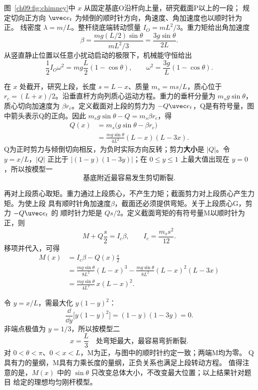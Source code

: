 \begin{xesolution}
图~\ref{ch09:fig:chimney}中 $x$ 从固定基底O沿杆向上量，研究截面P以上的一段；
规定切向正方向 $\uvec e_t$ 为倾倒的顺时针方向，角速度、角加速度也以顺时针为正。
线密度 $\lambda=m/L$。整杆绕底端转动惯量
$I_O=mL^2/3$。重力矩给出角加速度
\[
 \beta=\frac{mg(L/2)\sin\theta}{mL^2/3}
 =\frac{3g\sin\theta}{2L}.
\]
从竖直静止位置以任意小扰动启动的极限下，机械能守恒给出
\[
 \frac12I_O\omega^2=mg\frac L2(1-\cos\theta),
 \qquad
 \omega^2=\frac{3g}{L}(1-\cos\theta).
\]

在 $x$ 处截开，研究上段，长度 $s=L-x$、质量 $m_s=ms/L$，质心位于
$r_c=(L+x)/2$。沿垂直杆方向列质心运动方程。重力的垂杆分量为
$m_sg\sin\theta$，质心切向加速度为 $\beta r_c$。定义截面对上段的剪力为
$-Q\uvec e_t$，Q是有符号量，图中箭头表示Q的正向。因此
$m_sg\sin\theta-Q=m_s\beta r_c$，得
\begin{align*}
 Q(x)&=m_s\bigl(g\sin\theta-\beta r_c\bigr)\\
 &=\frac{mg\sin\theta}{4L^2}(L-x)(L-3x).
\end{align*}
Q为正时剪力与倾倒切向相反，为负时实际方向反转；剪力\textbf{大小}是 $|Q|$。令 $y=x/L$，$|Q|$ 正比于
$|(1-y)(1-3y)|$；在 $0\le y\le1$ 上最大值出现在 $y=0$，所以按模型一
\[
 \boxed{\text{基底附近最容易发生剪切断裂}}.
\]

再对上段质心取矩。重力通过上段质心，不产生力矩；截面剪力对上段质心产生力矩。为使上段
具有顺时针角加速度$\beta$，截面还必须提供弯矩。关于上段质心G，剪力 $-Q\uvec e_t$ 的
顺时针力矩是 $Qs/2$。定义截面弯矩的有符号量M以顺时针为正，则
\[
 M+Q\frac s2=I_c\beta,\qquad I_c=\frac{m_ss^2}{12}.
\]
移项并代入，可得
\begin{align*}
 M(x)&=I_c\beta-Q(x)\frac s2\\
 &=\frac{mg\sin\theta}{8L^2}(L-x)^3
   -\frac{mg\sin\theta}{8L^2}(L-x)^2(L-3x)\\
 &=\frac{mg\sin\theta}{4L^2}\,x(L-x)^2.
\end{align*}
\end{xesolution}

\begin{solutioncontinuation}
\enlargethispage{\baselineskip}
令 $y=x/L$，需最大化 $y(1-y)^2$：
\[
 \frac{\dd}{\dd y}\bigl[y(1-y)^2\bigr]
 =(1-y)(1-3y)=0.
\]
非端点极值为 $y=1/3$，所以按模型二
\[
 \boxed{x=\frac L3\quad\text{处弯矩最大，最容易弯折断裂}}.
\]
对 $0<\theta<\pi$、$0<x<L$，M为正，与图中的顺时针约定一致；两端M均为零。
Q具有力的量纲，M具有力乘长度的量纲，正负关系也满足上段转动方程。
值得注意的是，$M(x)$ 中的 $\sin\theta$ 只改变总体大小，不改变最大位置；以上结果针对题目
给定的理想均匀刚杆模型。
\end{solutioncontinuation}
